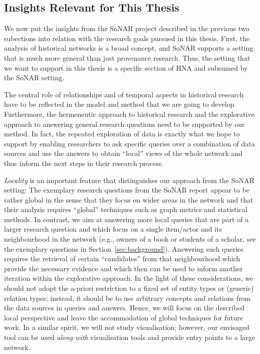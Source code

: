 
\subsection{Insights Relevant for This Thesis}
\label{sec:insights_from_SoNAR}

We now put the insights from the \gls{SoNAR} project described in the previous two subections
into relation with the research goals pursued in this thesis.
First, the analysis of historical networks is a broad concept, and \gls{SoNAR} supports a setting
that is much more general than just provenance research.
Thus, the setting that we want to support in this thesis is a specific section of \gls{HNA} and subsumed 
by the \gls{SoNAR} setting.

The central role of relationships and of temporal aspects in historical research
have to be reflected in the model and method that we are going to develop.
Furthermore, the hermeneutic approach to historical research
and the explorative approach to answering general research questions 
need to be supported by our method. In fact, the repeated exploration of data
is exactly what we hope to support by enabling researchers to ask specific
queries over a combination of data sources and use the answers to obtain
\enquote{local} views of the whole network and thus inform the next steps in their research process.

\emph{Locality} is an important feature that distinguishes our approach from the \gls{SoNAR} setting:
The exemplary research questions from the \gls{SoNAR} report appear to be rather global
in the sense that they focus on wider areas in the network and that their analysis requires
\enquote{global} techniques such as graph metrics and statistical methods.
In contrast, we aim at answering more local queries
that are part of a larger research question and which 
focus on a single item/actor and its neighbourhood in the network
(e.g., owners of a book or students of a scholar, see the exemplary questions
in Section~\ref{sec:background}). Answering such queries
requires the retrieval of certain \enquote{candidates} from that neighbourhood
which provide the necessary evidence and which then can be used
to inform another iteration within the explorative approach.
In the light of these considerations, 
we should not adopt the a-priori restriction
to a fixed set of entity types or (generic) relation types;
instead, it should be to use arbitrary concepts and relations
from the data sources in queries and answers.
Hence, we will focus on the described local perspective
and leave the accommodation of global techniques for future work.
In a similar spirit, we will not study visualisation;
however, our envisaged tool can be used \emph{along with} visualisation tools
and provide entry points to a large network.

